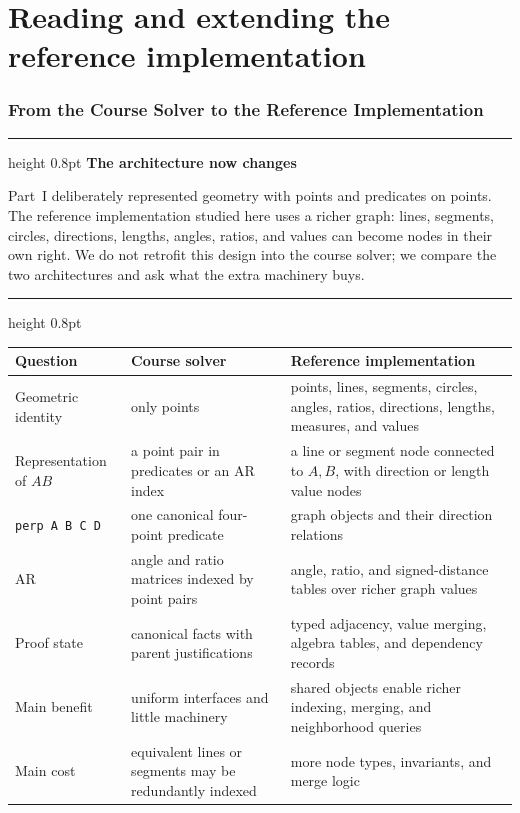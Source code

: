 \documentclass[reqno]{amsart}
\newenvironment{lecturebox}[1]{%
    \par\medskip
    \noindent\begingroup
    \setlength{\parindent}{0pt}
    \color{agblue}\hrule height 0.8pt\color{black}
    \smallskip
    \textbf{\color{agblue}#1}\par\smallskip
}{%
    \smallskip
    \color{agblue}\hrule height 0.8pt\color{black}
    \endgroup
    \medskip
}
\DeclareMathOperator{\1}{\textbf{1}}
\begin{document}
\part{Reading and extending the reference implementation}

\section{From the Course Solver to the Reference Implementation}
\label{sec: architecture comparison}

\begin{lecturebox}{The architecture now changes}
Part~I deliberately represented geometry with points and predicates on points.
The reference implementation studied here uses a richer graph: lines,
segments, circles, directions, lengths, angles, ratios, and values can become
nodes in their own right. We do not retrofit this design into the course
solver; we compare the two architectures and ask what the extra machinery buys.
\end{lecturebox}

\begin{center}
\begin{tabular}{p{}p{}p{}}
\textbf{Question} & \textbf{Course solver} &
\textbf{Reference implementation} \\
\hline
Geometric identity & only points & points, lines, segments, circles, angles,
ratios, directions, lengths, measures, and values \\
Representation of $AB$ & a point pair in predicates or an AR index & a line
or segment node connected to $A,B$, with direction or length value nodes \\
\verb|perp A B C D| & one canonical four-point predicate & graph objects and
their direction relations \\
AR & angle and ratio matrices indexed by point pairs & angle, ratio, and
signed-distance tables over richer graph values \\
Proof state & canonical facts with parent justifications & typed adjacency,
value merging, algebra tables, and dependency records \\
Main benefit & uniform interfaces and little machinery & shared objects enable
richer indexing, merging, and neighborhood queries \\
Main cost & equivalent lines or segments may be redundantly indexed & more
node types, invariants, and merge logic \\
\end{tabular}
\end{center}
\end{document}
